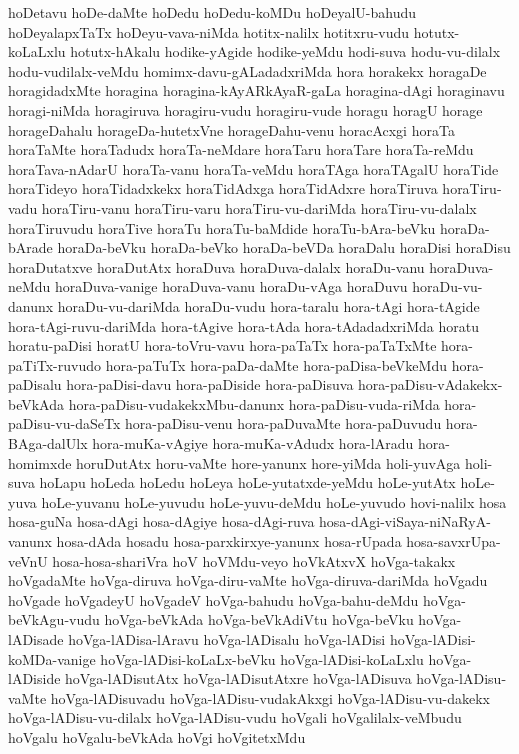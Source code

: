 {hoDetavu
hoDe-daMte
hoDedu
hoDedu-koMDu
hoDeyalU-bahudu
hoDeyalapxTaTx
hoDeyu-vava-niMda
hotitx-nalilx
hotitxru-vudu
hotutx-koLaLxlu
hotutx-hAkalu
hodike-yAgide
hodike-yeMdu
hodi-suva
hodu-vu-dilalx
hodu-vudilalx-veMdu
homimx-davu-gALadadxriMda
hora
horakekx
horagaDe
horagidadxMte
horagina
horagina-kAyARkAyaR-gaLa
horagina-dAgi
horaginavu
horagi-niMda
horagiruva
horagiru-vudu
horagiru-vude
horagu
horagU
horage
horageDahalu
horageDa-hutetxVne
horageDahu-venu
horacAcxgi
horaTa
horaTaMte
horaTadudx
horaTa-neMdare
horaTaru
horaTare
horaTa-reMdu
horaTava-nAdarU
horaTa-vanu
horaTa-veMdu
horaTAga
horaTAgalU
horaTide
horaTideyo
horaTidadxkekx
horaTidAdxga
horaTidAdxre
horaTiruva
horaTiru-vadu
horaTiru-vanu
horaTiru-varu
horaTiru-vu-dariMda
horaTiru-vu-dalalx
horaTiruvudu
horaTive
horaTu
horaTu-baMdide
horaTu-bAra-beVku
horaDa-bArade
horaDa-beVku
horaDa-beVko
horaDa-beVDa
horaDalu
horaDisi
horaDisu
horaDutatxve
horaDutAtx
horaDuva
horaDuva-dalalx
horaDu-vanu
horaDuva-neMdu
horaDuva-vanige
horaDuva-vanu
horaDu-vAga
horaDuvu
horaDu-vu-danunx
horaDu-vu-dariMda
horaDu-vudu
hora-taralu
hora-tAgi
hora-tAgide
hora-tAgi-ruvu-dariMda
hora-tAgive
hora-tAda
hora-tAdadadxriMda
horatu
horatu-paDisi
horatU
hora-toVru-vavu
hora-paTaTx
hora-paTaTxMte
hora-paTiTx-ruvudo
hora-paTuTx
hora-paDa-daMte
hora-paDisa-beVkeMdu
hora-paDisalu
hora-paDisi-davu
hora-paDiside
hora-paDisuva
hora-paDisu-vAdakekx-beVkAda
hora-paDisu-vudakekxMbu-danunx
hora-paDisu-vuda-riMda
hora-paDisu-vu-daSeTx
hora-paDisu-venu
hora-paDuvaMte
hora-paDuvudu
hora-BAga-dalUlx
hora-muKa-vAgiye
hora-muKa-vAdudx
hora-lAradu
hora-homimxde
horuDutAtx
horu-vaMte
hore-yanunx
hore-yiMda
holi-yuvAga
holi-suva
hoLapu
hoLeda
hoLedu
hoLeya
hoLe-yutatxde-yeMdu
hoLe-yutAtx
hoLe-yuva
hoLe-yuvanu
hoLe-yuvudu
hoLe-yuvu-deMdu
hoLe-yuvudo
hovi-nalilx
hosa
hosa-guNa
hosa-dAgi
hosa-dAgiye
hosa-dAgi-ruva
hosa-dAgi-viSaya-niNaRyA-vanunx
hosa-dAda
hosadu
hosa-parxkirxye-yanunx
hosa-rUpada
hosa-savxrUpa-veVnU
hosa-hosa-shariVra
hoV
hoVMdu-veyo
hoVkAtxvX
hoVga-takakx
hoVgadaMte
hoVga-diruva
hoVga-diru-vaMte
hoVga-diruva-dariMda
hoVgadu
hoVgade
hoVgadeyU
hoVgadeV
hoVga-bahudu
hoVga-bahu-deMdu
hoVga-beVkAgu-vudu
hoVga-beVkAda
hoVga-beVkAdiVtu
hoVga-beVku
hoVga-lADisade
hoVga-lADisa-lAravu
hoVga-lADisalu
hoVga-lADisi
hoVga-lADisi-koMDa-vanige
hoVga-lADisi-koLaLx-beVku
hoVga-lADisi-koLaLxlu
hoVga-lADiside
hoVga-lADisutAtx
hoVga-lADisutAtxre
hoVga-lADisuva
hoVga-lADisu-vaMte
hoVga-lADisuvadu
hoVga-lADisu-vudakAkxgi
hoVga-lADisu-vu-dakekx
hoVga-lADisu-vu-dilalx
hoVga-lADisu-vudu
hoVgali
hoVgalilalx-veMbudu
hoVgalu
hoVgalu-beVkAda
hoVgi
hoVgitetxMdu
}
